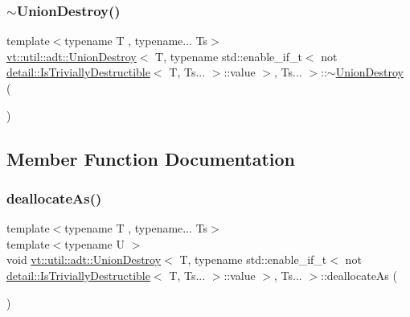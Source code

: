\subsubsection{\texorpdfstring{$\sim$\+Union\+Destroy()}{~UnionDestroy()}}
{\footnotesize\ttfamily template$<$typename T , typename... Ts$>$ \\
\hyperlink{structvt_1_1util_1_1adt_1_1_union_destroy}{vt\+::util\+::adt\+::\+Union\+Destroy}$<$ T, typename std\+::enable\+\_\+if\+\_\+t$<$ not \hyperlink{structvt_1_1util_1_1adt_1_1detail_1_1_is_trivially_destructible}{detail\+::\+Is\+Trivially\+Destructible}$<$ T, Ts... $>$\+::value $>$, Ts... $>$\+::$\sim$\hyperlink{structvt_1_1util_1_1adt_1_1_union_destroy}{Union\+Destroy} (\begin{DoxyParamCaption}{ }\end{DoxyParamCaption})\hspace{0.3cm}{\ttfamily [inline]}}



\subsection{Member Function Documentation}
\mbox{\label{structvt_1_1util_1_1adt_1_1_union_destroy_3_01_t_00_01typename_01std_1_1enable__if__t_3_01not_0117947c5b8b44b7d9f4a4df27d8795277_a699eec83059ebb0e747ac7549e2aaf29}} 
\subsubsection{\texorpdfstring{deallocate\+As()}{deallocateAs()}}
{\footnotesize\ttfamily template$<$typename T , typename... Ts$>$ \\
template$<$typename U $>$ \\
void \hyperlink{structvt_1_1util_1_1adt_1_1_union_destroy}{vt\+::util\+::adt\+::\+Union\+Destroy}$<$ T, typename std\+::enable\+\_\+if\+\_\+t$<$ not \hyperlink{structvt_1_1util_1_1adt_1_1detail_1_1_is_trivially_destructible}{detail\+::\+Is\+Trivially\+Destructible}$<$ T, Ts... $>$\+::value $>$, Ts... $>$\+::deallocate\+As (\begin{DoxyParamCaption}{ }\end{DoxyParamCaption})\hspace{0.3cm}{\ttfamily [inline]}}



